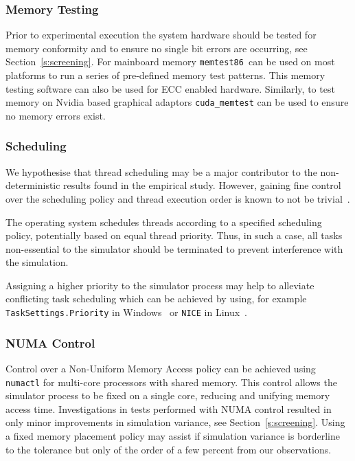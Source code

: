 \documentclass[runningheads,twocolumn,a4paper,10pt]{llncs}
\begin{document}
\subsubsection{Memory Testing}
Prior to experimental execution the system hardware should be tested for memory conformity and to ensure no single bit errors are occurring, see Section~\ref{s:screening}. For mainboard memory \texttt{memtest86}\ can be used on most platforms to run a series of pre-defined memory test patterns. This memory testing software can also be used for ECC enabled hardware. Similarly, to test memory on Nvidia based graphical adaptors \texttt{cuda\_memtest} can be used to ensure no memory errors exist.


\subsubsection{Scheduling}
We hypothesise that thread scheduling may be a major contributor to the non-deterministic results found in the empirical study. However, gaining fine control over the scheduling policy and thread execution order is known to not be trivial~\cite{acm-q-rr-interview}. 

The operating system schedules threads according to a specified scheduling policy, potentially based on equal thread priority. Thus, in such a case, all tasks non-essential to the simulator should be terminated to prevent interference with the simulation. 

Assigning a higher priority to the simulator process may help to alleviate conflicting task scheduling which can be achieved by using, for example \texttt{TaskSettings.Priority} in Windows~\cite{TaskSettingWindows} or \texttt{NICE} in Linux~\cite{Nice_linux}.

\subsubsection{NUMA Control}
Control over a Non-Uniform Memory Access policy can be achieved using \texttt{numactl} for multi-core processors with shared memory. This control allows the simulator process to be fixed on a single core, reducing and unifying memory access time.
%
Investigations in tests performed with NUMA control resulted in only minor improvements in simulation variance, see Section~\ref{s:screening}. 
%
%
Using a fixed memory placement policy may assist if simulation variance is borderline to the tolerance but only of the order of a few percent from our observations.
\end{document}

